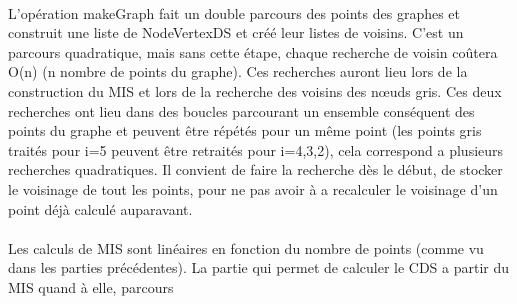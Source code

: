 \paragraph{}
L'opération makeGraph fait un double parcours des points des graphes et construit une liste de NodeVertexDS et créé leur listes de voisins.
C'est un parcours quadratique, mais sans cette étape, chaque recherche de voisin coûtera O(n) (n nombre de points du graphe). Ces recherches auront lieu lors de la construction du MIS et lors de la recherche des voisins des nœuds gris.
Ces deux recherches ont lieu dans des boucles parcourant un ensemble conséquent des points du graphe et peuvent être répétés pour un même point (les points gris traités pour i=5 peuvent être retraités pour i=4,3,2), cela correspond a plusieurs recherches quadratiques. Il convient de faire la recherche dès le début, de stocker le voisinage de tout les points, pour ne pas avoir à a recalculer le voisinage d'un point déjà calculé auparavant.

\paragraph{}
Les calculs de MIS sont linéaires en fonction du nombre de points (comme vu dans les parties précédentes).
La partie qui permet de calculer le CDS a partir du MIS quand à elle, parcours